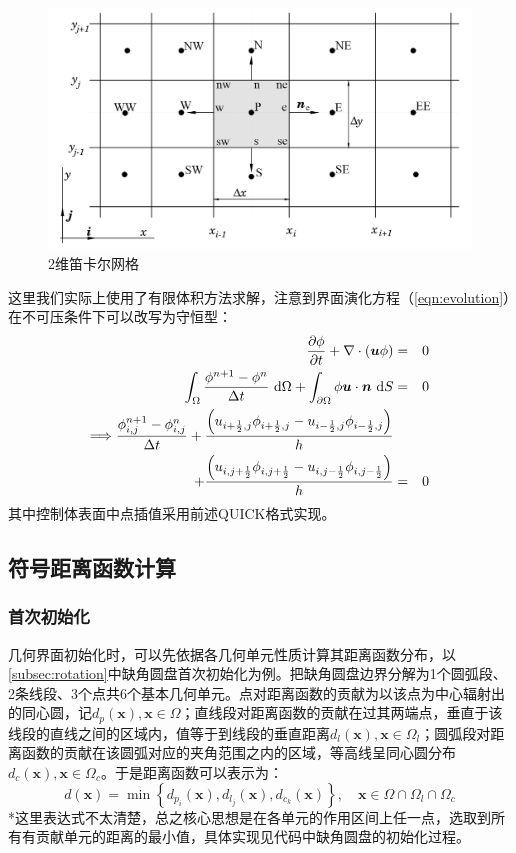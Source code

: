 \documentclass[11pt]{article}
\begin{document}
\begin{figure}[htbp]
    \centering
    \includegraphics[width=0.6\linewidth]{figure/gridfvm.png}
    \caption{\label{fig:gridfvm}2维笛卡尔网格\citep{ferziger_computational_2020}}
\end{figure}

这里我们实际上使用了有限体积方法求解，注意到界面演化方程（\autoref{eqn:evolution}）在不可压条件下可以改写为守恒型：
\begin{eqnarray}
    \frac{\partial \phi}{\partial t}+\nabla\cdot\left(\bm{u}\phi\right)&=&0 \\
    \int_\Omega \frac{\phi^{n+1}-\phi^n}{\Delta t}\ \mathrm{d}\Omega+\int_{\partial\Omega}\phi\bm{u}\cdot\bm{n}\ \mathrm{d}S&=&0 \\
    \Longrightarrow \frac{\phi^{n+1}_{i,j}-\phi^n_{i,j}}{\Delta t}+\frac{\left(u_{i+\frac{1}{2},j}\phi_{i+\frac{1}{2},j}-u_{i-\frac{1}{2},j}\phi_{i-\frac{1}{2},j}\right)}{h} & & \notag\\+\frac{\left(u_{i,j +\frac{1}{2}}\phi_{i,j+\frac{1}{2}}-u_{i,j-\frac{1}{2}}\phi_{i,j-\frac{1}{2}}\right)}{h}&=&0
\end{eqnarray}
其中控制体表面中点插值采用前述QUICK格式实现。

\subsection{符号距离函数计算}
\subsubsection{首次初始化}
几何界面初始化时，可以先依据各几何单元性质计算其距离函数分布，以\autoref{subsec:rotation}中缺角圆盘首次初始化为例。把缺角圆盘边界分解为1个圆弧段、2条线段、3个点共6个基本几何单元。点对距离函数的贡献为以该点为中心辐射出的同心圆，记$d_{p}(\bm{x}),\bm{x}\in\Omega$；直线段对距离函数的贡献在过其两端点，垂直于该线段的直线之间的区域内，值等于到线段的垂直距离$d_{l}(\bm{x}),\bm{x}\in\Omega_l$；圆弧段对距离函数的贡献在该圆弧对应的夹角范围之内的区域，等高线呈同心圆分布$d_{c}(\bm{x}),\bm{x}\in\Omega_c$。于是距离函数可以表示为：
\begin{equation}
    d(\bm{x})=\min\left\{
    d_{p_i}(\bm{x}),d_{l_j}(\bm{x}),d_{c_k}(\bm{x})
    \right\},\quad \bm{x}\in\Omega\cap\Omega_l\cap\Omega_c
\end{equation}
*这里表达式不太清楚，总之核心思想是在各单元的作用区间上任一点，选取到所有有贡献单元的距离的最小值，具体实现见代码中缺角圆盘的初始化过程。
\end{document}
